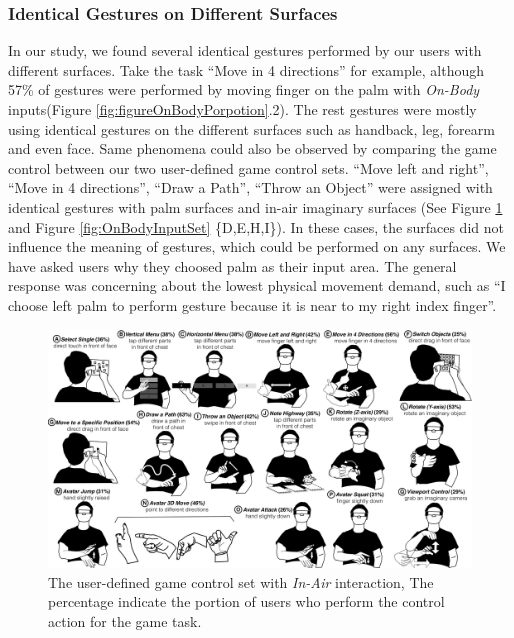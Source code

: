 \documentclass{sigchi}
\begin{document}
\subsubsection{Identical Gestures on Different Surfaces}
 In our study, we found several identical gestures performed by our users with different surfaces. Take the task ``Move in 4 directions'' for example, although 57\% of gestures were performed by moving finger on the palm with \emph{On-Body} inputs(Figure \ref{fig:figureOnBodyPorpotion}.2). The rest gestures were mostly using identical gestures on the different surfaces such as handback, leg, forearm and even face. Same phenomena could also be observed by comparing the game control between our two user-defined game control sets. ``Move left and right'', ``Move in 4 directions'', ``Draw a Path'', ``Throw an Object'' were assigned with identical gestures with palm surfaces and in-air imaginary surfaces (See Figure \ref{fig:InAirSet} and Figure \ref{fig:OnBodyInputSet} \{D,E,H,I\}). In these cases, the surfaces did not influence the meaning of gestures, which could be performed on any surfaces. We have asked users why they choosed palm as their input area. The general response was concerning about the lowest physical movement demand, such as ``I choose left palm to perform gesture because it is near to my right index finger''.


  \begin{figure}
  \centering
  \includegraphics[width=1\textwidth]{InAirSet.pdf}
  \caption{The user-defined game control set with \emph{In-Air} interaction, The percentage indicate the portion of users who perform the control action for the game task.}
  \label{fig:InAirSet}
  \end{figure}
\end{document}
